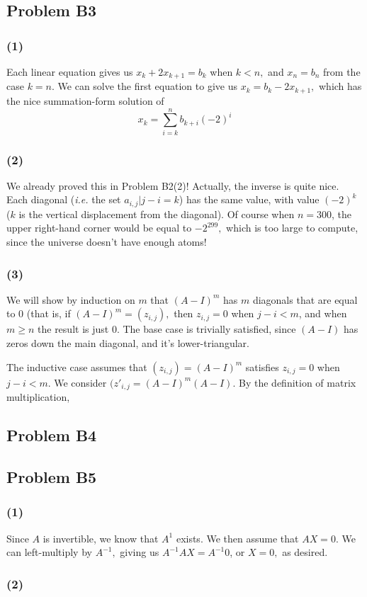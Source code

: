 \documentclass{article}
\begin{document}
\subsection{Problem B3}
\subsubsection{(1)}
Each linear equation gives us $x_k + 2x_{k+1} = b_k$ when $k < n,$ and
$x_n = b_n$ from the case $k = n.$ We can solve the first equation to give us
$x_k = b_k - 2x_{k+1},$ which has the nice summation-form solution of
\[x_k  = \sum_{i=k}^nb_{k+i}(-2)^i\]

\subsubsection{(2)}
We already proved this in Problem B2(2)!
Actually, the inverse is quite nice. Each diagonal (\emph{i.e.} the set
${a_{i,j}|j-i=k}$) has the same value, with value $(-2)^k$ ($k$ is the vertical
displacement from the diagonal).
Of course when $n=300$, the upper right-hand corner would be equal to
$-2^{299},$ which is too large to compute, since the universe doesn't have
enough atoms!

\subsubsection{(3)}
We will show by induction on $m$ that $(A-I)^m$ has $m$ diagonals that are equal
to 0 (that is, if $(A-I)^m = (z_{i,j}),$ then $z_{i,j} = 0$ when $j - i < m$,
and when $m \geq n$ the result is just 0.
The base case is trivially satisfied, since $(A-I)$ has zeros down the main
diagonal, and it's lower-triangular.

The inductive case assumes that $(z_{i,j}) = (A-I)^m$ satisfies 
$z_{i,j} = 0$ when $j - i < m$.
We consider $(z'_{i,j} = (A-I)^m(A-I).$
By the definition of matrix multiplication,

\subsection{Problem B4}
\subsection{Problem B5}
\subsubsection{(1)}
Since $A$ is invertible, we know that $A^{1}$ exists.
We then assume that $AX = 0.$ We can left-multiply by $A^{-1},$ giving us
$A^{-1}AX =  A^{-1}0$, or $X = 0,$ as desired.

\subsubsection{(2)}
\end{document}
